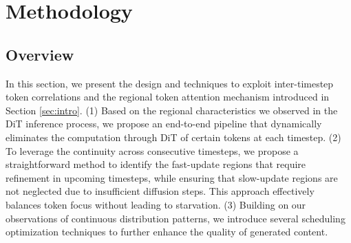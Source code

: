 \section{Methodology}
\label{sec.method}

\begin{table}[hbt]

\centering
\renewcommand\arraystretch{1.2}
\label{tab.symbo}
\caption{Meanings of the symbols that are used in this paper}
\end{table}

\subsection{Overview}
In this section, we present the \ourmethod{} design and techniques to exploit inter-timestep token correlations and the regional token attention mechanism introduced in Section \ref{sec:intro}. (1) Based on the regional characteristics we observed in the DiT inference process, we propose an end-to-end pipeline that dynamically eliminates the computation through DiT of certain tokens at each timestep. (2) To leverage the continuity across consecutive timesteps, we propose a straightforward method to identify the fast-update regions that require refinement in upcoming timesteps, while ensuring that slow-update regions are not neglected due to insufficient diffusion steps. This approach effectively balances token focus without leading to starvation. (3) Building on our observations of continuous distribution patterns, we introduce several scheduling optimization techniques to further enhance the quality of generated content. 




